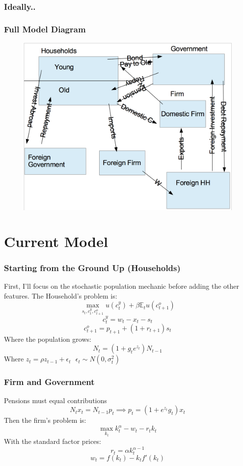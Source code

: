 \documentclass[11pt]{beamer}
\theoremstyle{definition}
\begin{document}
\begin{frame}
    \frametitle{Ideally..}
\frametitle{Full Model Diagram}
\begin{figure}
	\centering
	\includegraphics[scale=0.35]{Full_Model.png}
	\label{V5}
\end{figure}
\end{frame}

\section{Current Model} 
\begin{frame}
    \frametitle{Starting from the Ground Up (Households)}
    First, I'll focus on the stochastic population mechanic before adding the other features. The Household's problem is:
    \[\max_{s_t,c_t^y,c_{t+1}^o} u(c_t^y)+\beta \mathds{E}_t u(c_{t+1}^o)\]
    \[c_t^y = w_t - x_t - s_t\]
    \[c_{t+1}^o = p_{t+1} + (1+r_{t+1}) s_t\]
    Where the population grows:
    \[N_t = (1+g_t e^{z_t}) N_{t-1}\]
    Where $z_t = \rho z_{t-1} + \epsilon_t \text{   }\epsilon_t \sim N(0,\sigma_t^2)$


\end{frame}

\begin{frame}
    \frametitle{Firm and Government}
    Pensions must equal contributions
    \[N_t x_t = N_{t-1} p_t \implies p_t = (1+e^{z_t}g_t)x_t\]
    Then the firm's problem is:
    \[\max_{k_t} k_t^\alpha -w_t -r_t k_t\]
    With the standard factor prices:
    \[r_t = \alpha k_t^{\alpha-1}\]
    \[w_t = f(k_t) - k_t f'(k_t)\]

\end{frame}
\end{document}
